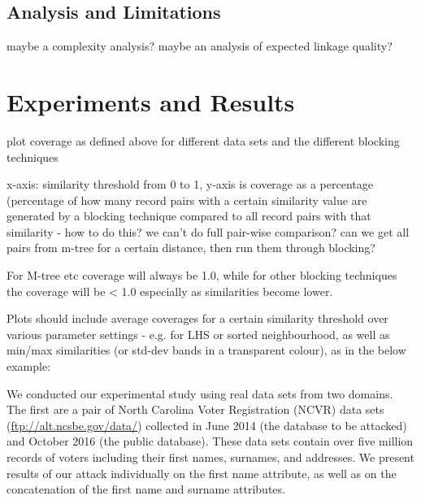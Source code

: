\documentclass{llncs}
\begin{document}

\subsection{Analysis and Limitations}
\label{sec-analysis}

maybe a complexity analysis? maybe an analysis of expected 
linkage quality?


\section{Experiments and Results}
\label{sec-data}

plot coverage as defined above for different data sets and the different blocking techniques

x-axis: similarity threshold from 0 to 1, y-axis is coverage as a
percentage (percentage of how many record pairs with a certain similarity value are generated by a blocking technique compared to all record pairs with that similarity - how to do this? we can't do full pair-wise comparison? can we get all pairs from m-tree for a certain distance, then run them through blocking?

For M-tree etc coverage will always be 1.0, while for other blocking techniques the coverage will be < 1.0 especially as similarities
become lower.

Plots should include average coverages for a certain similarity threshold over various parameter settings - e.g. for LHS or sorted neighbourhood, as well as min/max similarities (or std-dev bands in a transparent colour), as in the below example:




We conducted our experimental study using real data sets from two
domains.
%
The first are a pair of North Carolina Voter Registration (NCVR) data
sets (\url{ftp://alt.ncsbe.gov/data/})
collected in June 2014 (the database to be attacked) and October 2016
(the public database).
These data sets contain over five million records of voters including
their first names, surnames, and addresses. We present results of our
attack individually on the first name
attribute, as well as on the concatenation of the first name and
surname attributes.
\end{document}
